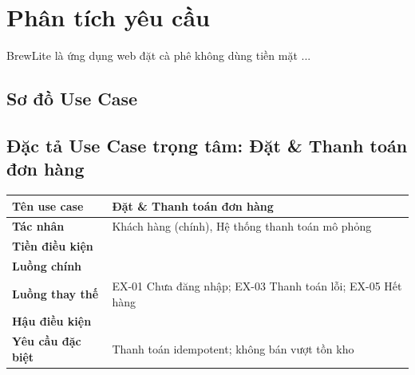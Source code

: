 \section{Phân tích yêu cầu}

BrewLite là ứng dụng web đặt cà phê không dùng tiền mặt ...

\subsection{Sơ đồ Use Case}

\subsection{Đặc tả Use Case trọng tâm: Đặt \& Thanh toán đơn hàng}
\begin{longtable}{|p{3.6cm}|p{11cm}|}
\hline
\textbf{Tên use case} & Đặt \& Thanh toán đơn hàng \\ \hline
\textbf{Tác nhân} & Khách hàng (chính), Hệ thống thanh toán mô phỏng \\ \hline
\textbf{Tiền điều kiện} & \\ \hline
\textbf{Luồng chính} & \\ \hline
\textbf{Luồng thay thế} & EX-01 Chưa đăng nhập; EX-03 Thanh toán lỗi; EX-05 Hết hàng \\ \hline
\textbf{Hậu điều kiện} & \\ \hline
\textbf{Yêu cầu đặc biệt} & Thanh toán idempotent; không bán vượt tồn kho \\ \hline
\end{longtable}

